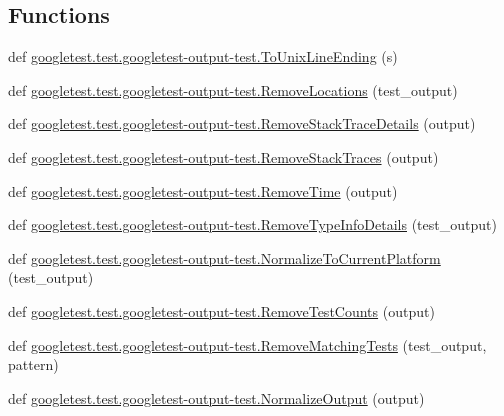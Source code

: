 \subsection*{Functions}
\begin{DoxyCompactItemize}
\item 
def \mbox{\hyperlink{namespacegoogletest_1_1test_1_1googletest-output-test_a3ff2f267c44ed5dd27ba7c518c2e5eef}{googletest.\+test.\+googletest-\/output-\/test.\+To\+Unix\+Line\+Ending}} (s)
\item 
def \mbox{\hyperlink{namespacegoogletest_1_1test_1_1googletest-output-test_a8887aec81bfc96f81fa1d252b5a6d01d}{googletest.\+test.\+googletest-\/output-\/test.\+Remove\+Locations}} (test\+\_\+output)
\item 
def \mbox{\hyperlink{namespacegoogletest_1_1test_1_1googletest-output-test_aa1969514763d6a962445f53ecfb41abf}{googletest.\+test.\+googletest-\/output-\/test.\+Remove\+Stack\+Trace\+Details}} (output)
\item 
def \mbox{\hyperlink{namespacegoogletest_1_1test_1_1googletest-output-test_a9a0decf62a91fdd58802a2da17829bb1}{googletest.\+test.\+googletest-\/output-\/test.\+Remove\+Stack\+Traces}} (output)
\item 
def \mbox{\hyperlink{namespacegoogletest_1_1test_1_1googletest-output-test_ac674d774c3fa9db5e31a2faba63a4cf9}{googletest.\+test.\+googletest-\/output-\/test.\+Remove\+Time}} (output)
\item 
def \mbox{\hyperlink{namespacegoogletest_1_1test_1_1googletest-output-test_aa20c45603c87652d78a77427bd88276f}{googletest.\+test.\+googletest-\/output-\/test.\+Remove\+Type\+Info\+Details}} (test\+\_\+output)
\item 
def \mbox{\hyperlink{namespacegoogletest_1_1test_1_1googletest-output-test_a5fc239cf98d093a53237164567c37e3e}{googletest.\+test.\+googletest-\/output-\/test.\+Normalize\+To\+Current\+Platform}} (test\+\_\+output)
\item 
def \mbox{\hyperlink{namespacegoogletest_1_1test_1_1googletest-output-test_a80bd550648220abb73a9fe43cadab20b}{googletest.\+test.\+googletest-\/output-\/test.\+Remove\+Test\+Counts}} (output)
\item 
def \mbox{\hyperlink{namespacegoogletest_1_1test_1_1googletest-output-test_ae12b8b8e5cc6efd5dd1452923b347cb7}{googletest.\+test.\+googletest-\/output-\/test.\+Remove\+Matching\+Tests}} (test\+\_\+output, pattern)
\item 
def \mbox{\hyperlink{namespacegoogletest_1_1test_1_1googletest-output-test_a9654817b6fb7fc3acc034ea375b635c8}{googletest.\+test.\+googletest-\/output-\/test.\+Normalize\+Output}} (output)

\end{DoxyCompactItemize}

